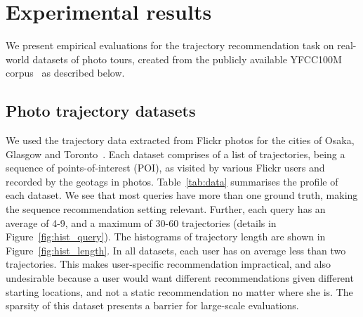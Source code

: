 
\section{Experimental results}
\label{sec:experiment}


We present empirical evaluations for the trajectory recommendation task %
on real-world datasets of photo tours,
created from the publicly available YFCC100M corpus~\cite{thomee2016yfcc100m} as described below.


\subsection{Photo trajectory datasets}
\label{sec:dataset}

We used the trajectory data %
extracted from Flickr photos for the cities of Osaka, Glasgow and Toronto~\cite{ijcai15,cikm16paper}.
Each dataset comprises of a list of trajectories, being a sequence of points-of-interest (POI),
as visited by various Flickr users and recorded by the geotags in photos.
Table~\ref{tab:data} summarises the profile of each dataset.
We see that most queries have more than one ground truth, making the sequence recommendation setting relevant. Further, each query has an average of 4-9, and a maximum of 30-60 trajectories (details in Figure~\ref{fig:hist_query}).
The histograms of trajectory length are shown in Figure~\ref{fig:hist_length}.
In all datasets,
each user has on average less than two trajectories.
This makes user-specific recommendation impractical, and also undesirable because
a user would want different recommendations given different starting locations, and not a static recommendation no matter where she is.
The sparsity of this dataset presents a barrier for large-scale evaluations.

